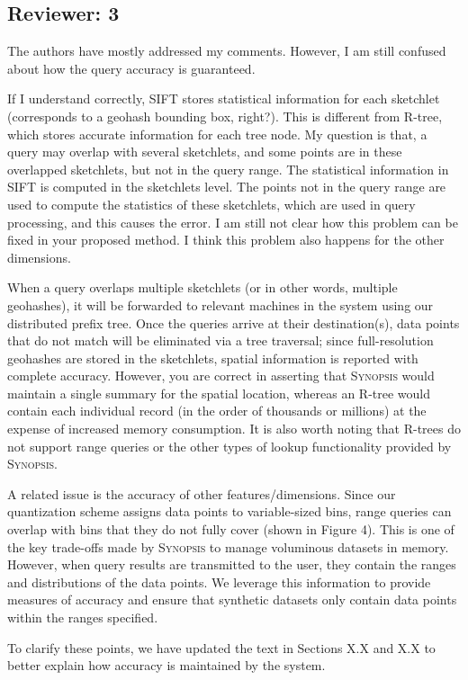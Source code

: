\documentclass{article}
\begin{document}
\subsection*{Reviewer: 3}\label{reviewer-3}

The authors have mostly addressed my comments. However, I am still confused about how the query accuracy is guaranteed.

If I understand correctly, SIFT stores statistical information for each sketchlet (corresponds to a geohash bounding box, right?). This is different from R-tree, which stores accurate information for each tree node. My question is that, a query may overlap with several sketchlets, and some points are in these overlapped sketchlets, but not in the query range. The statistical information in SIFT is computed in the sketchlets level. The points not in the query range are used to compute the statistics of these sketchlets, which are used in query processing, and this causes the error. I am still not clear how this problem can be fixed in your proposed method. I think this problem also happens for the other dimensions.

\begin{tcolorbox}
    When a query overlaps multiple sketchlets (or in other words, multiple geohashes), it will be forwarded to relevant machines in the system using our distributed prefix tree. Once the queries arrive at their destination(s), data points that do not match will be eliminated via a tree traversal; since full-resolution geohashes are stored in the sketchlets, spatial information is reported with complete accuracy. However, you are correct in asserting that \textsc{Synopsis} would maintain a single summary for the spatial location, whereas an R-tree would contain each individual record (in the order of thousands or millions) at the expense of increased memory consumption. It is also worth noting that R-trees do not support range queries or the other types of lookup functionality provided by \textsc{Synopsis}.

    A related issue is the accuracy of other features/dimensions. Since our quantization scheme assigns data points to variable-sized bins, range queries can overlap with bins that they do not fully cover (shown in Figure 4). This is one of the key trade-offs made by \textsc{Synopsis} to manage voluminous datasets in memory. However, when query results are transmitted to the user, they contain the ranges and distributions of the data points. We leverage this information to provide measures of accuracy and ensure that synthetic datasets only contain data points within the ranges specified.

    To clarify these points, we have updated the text in Sections X.X and X.X to better explain how accuracy is maintained by the system.
\end{tcolorbox}
\end{document}
